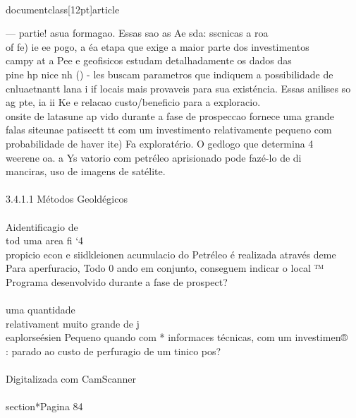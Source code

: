 \\documentclass[12pt]{article}
\begin{document}
{— partie! asua formagao. Essas sao as Ae sda: sscnicas a roa\\
of fe) ie ee pogo, a éa etapa que exige a maior parte dos investimentos\\
campy at a Pee e geofisicos estudam detalhadamente os dados das\\
pine hp nice nh () - les buscam parametros que indiquem a possibilidade de\\
cnluaetnantt lana i if locais mais provaveis para sua existéncia. Essas anilises so\\
ag pte, ia ii Ke e relacao custo/beneficio para a exploracio.\\
onsite de latasune ap vido durante a fase de prospeccao fornece uma grande\\
falas siteunae patisectt tt com um investimento relativamente pequeno com\\
probabilidade de haver ite) Fa exploratério. O gedlogo que determina 4\\
weerene oa. a Ys vatorio com petréleo aprisionado pode fazé-lo de di\\
manciras, uso de imagens de satélite.\\
\\
3.4.1.1 Métodos Geoldégicos\\
\\
Aidentificagio de\\
tod uma area fi ‘4\\
propicio econ e siidkleionen acumulacio do Petréleo é realizada através deme\\
Para aperfuracio, Todo 0 ando em conjunto, conseguem indicar o local ™\\
Programa desenvolvido durante a fase de prospect?\\
\\
uma quantidade\\
relativament muito grande de j\\
eaplorseésien Pequeno quando com * informaces técnicas, com um investimen®\\
: parado ao custo de perfuragio de um tinico pos?\\
\\
Digitalizada com CamScanner\\

\\section*{Pagina 84}

}
\end{document}
